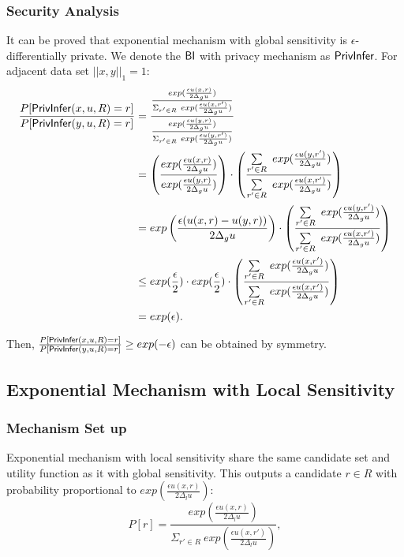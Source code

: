 
\subsubsection{Security Analysis}
It can be proved that exponential mechanism with global sensitivity is $\epsilon$-differentially private. We denote the $\mathsf{BI}$ with privacy mechanism as $\mathsf{PrivInfer}$. For adjacent data set $||x,y||_1 = 1$:
\begin{equation*}
\begin{split}
\frac{P[\mathsf{PrivInfer}(x,u,R) = r]}{P[\mathsf{PrivInfer}(y,u,R) = r]}
& =\frac
{\frac
{exp(\frac{\epsilon u(x,r)}{2 \Delta_{g}u})}
{\Sigma_{r' \in R}\ exp(\frac{\epsilon u(x,r')}{2 \Delta_{g}u})}}
{\frac
{exp(\frac{\epsilon u(y,r)}{2 \Delta_{g}u})}
{\Sigma_{r' \in R}\ exp(\frac{\epsilon u(y,r')}{2 \Delta_{g}u})}} \\
& = \left(\frac
{exp(\frac{\epsilon u(x,r)}{2 \Delta_{g}u})}
{exp(\frac{\epsilon u(y,r)}{2 \Delta_{g}u})}
\right)
\cdot
\left(\frac
{\sum\limits_{r' \in R}\ exp(\frac{\epsilon u(y,r')}{2 \Delta_{g}u})}
{\sum\limits_{r' \in R}\ exp(\frac{\epsilon u(x,r')}{2 \Delta_{g}u})}
\right)\\
& = exp\left(\frac
{\epsilon (u(x,r) - u(y,r))}
{2 \Delta_{g}u}
\right)
\cdot
\left(\frac
{\sum\limits_{r' \in R}\ exp(\frac{\epsilon u(y,r')}{2 \Delta_{g}u})}
{\sum\limits_{r' \in R}\ exp(\frac{\epsilon u(x,r')}{2 \Delta_{g}u})}
\right)\\
& \leq
exp(\frac{\epsilon}{2}) \cdot exp(\frac{\epsilon}{2}) \cdot
\left(\frac
{\sum\limits_{r' \in R}\ exp(\frac{\epsilon u(x,r')}{2 \Delta_{g}u})}
{\sum\limits_{r' \in R}\ exp(\frac{\epsilon u(x,r')}{2 \Delta_{g}u})}
\right)\\
& = exp(\epsilon).
\end{split}
\end{equation*}

Then, $\frac{P[\mathsf{PrivInfer}(x,u,R) = r]}{P[\mathsf{PrivInfer}(y,u,R) = r]} \geq exp(-\epsilon)$ can be obtained by symmetry.


\subsection{Exponential Mechanism with Local Sensitivity}
\label{subsec_emls}
\subsubsection{Mechanism Set up}
Exponential mechanism with local sensitivity share the same candidate set and utility function as it with global sensitivity. This outputs a candidate $r \in R$ with probability proportional to $exp(\frac{\epsilon u(x,r)}{2 \Delta_{l}u})$:
\begin{equation*}
P[r] = \frac
{exp(\frac{\epsilon u(x,r)}{2 \Delta_{l}u})}
{\Sigma_{r' \in R}\ exp(\frac{\epsilon u(x,r')}{2 \Delta_{l}u})},
\end{equation*}

